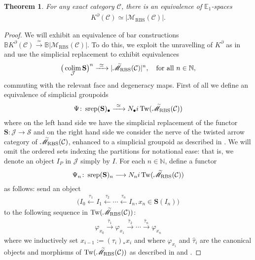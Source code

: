 \documentclass[12pt, reqno]{amsart}
\theoremstyle{plain}
\newtheorem{theorem}{Theorem}[section]
\theoremstyle{definition}
\newcommand{\N}{\mathbb N}
\renewcommand{\phi}{\varphi}
\begin{document}
\begin{theorem}\label{equivalence of E1-spaces}
For any exact category $\mathcal{C}$, there is an equivalence of $\mathbb{E}_1$-spaces
\begin{align*}
K^\partial(\mathcal{C})\simeq |\mathscr{M}_{\operatorname{RBS}}(\mathcal{C})|.
\end{align*}
\end{theorem}
\begin{proof}
We will exhibit an equivalence of bar constructions $\mathbb{B}K^\partial (\mathcal{C})\xrightarrow{\simeq} \mathbb{B}|\mathscr{M}_{\operatorname{RBS}}(\mathcal{C})|$. To do this, we exploit the unravelling of $K^\partial$ as in  and use the simplicial replacement to exhibit equivalences
\begin{align*}
\big(\mathop{\operatorname{colim}}_{\mathcal{J}}\mathbf{S}\big)^n \xrightarrow{\ \simeq\ } |\accentset{\sim}{\mathscr{M}}_{\operatorname{RBS}}(\mathcal{C})|^n, \quad \text{for all } n\in \N,
\end{align*}
commuting with the relevant face and degeneracy maps. First of all we define an equivalence of simplicial groupoids
\begin{align*}
\Psi\colon \operatorname{srep}(\mathbf{S})_\bullet\xrightarrow{\ \simeq\ } N_\bullet i\operatorname{Tw}(\accentset{\sim}{\mathscr{M}}_{\operatorname{RBS}}(\mathcal{C}))
\end{align*}
where on the left hand side we have the simplicial replacement of the functor $\mathbf{S}\colon \mathcal{J}\rightarrow \mathcal{S}$ and on the right hand side we consider the nerve of the twisted arrow category of $\accentset{\sim}{\mathscr{M}}_{\operatorname{RBS}}(\mathcal{C})$, enhanced to a simplicial groupoid as described in . We will omit the ordered sets indexing the partitions for notational ease: that is, we denote an object $I_P$ in $\mathcal{J}$ simply by $I$. For each $n\in \N$, define a functor
\begin{align*}
\Psi_n\colon \operatorname{srep}(\mathbf{S})_n\longrightarrow N_n i\operatorname{Tw}(\accentset{\sim}{\mathscr{M}}_{\operatorname{RBS}}(\mathcal{C}))
\end{align*}
as follows: send an object
\begin{align*}
\big(I_0\xleftarrow{\tau_1} I_1\xleftarrow{\tau_2} \cdots \xleftarrow{\tau_n} I_n, x_n\in \mathbf{S}(I_n)\big)
\end{align*}
to the following sequence in $\operatorname{Tw}(\accentset{\sim}{\mathscr{M}}_{\operatorname{RBS}}(\mathcal{C}))$:
\begin{align*}
\phi_{x_0}\xrightarrow{\hat{\tau}_1}\phi_{x_1}\xrightarrow{\hat{\tau}_2}\cdots \xrightarrow{\hat{\tau}_n} \phi_{x_n}
\end{align*}
where we inductively set $x_{i-1}:=(\tau_i)_*x_i$ and where $\phi_{x_i}$ and $\hat{\tau}_i$ are the canonical objects and morphisms of $\operatorname{Tw}(\accentset{\sim}{\mathscr{M}}_{\operatorname{RBS}}(\mathcal{C}))$ as described in  and .


\end{proof}
\end{document}
